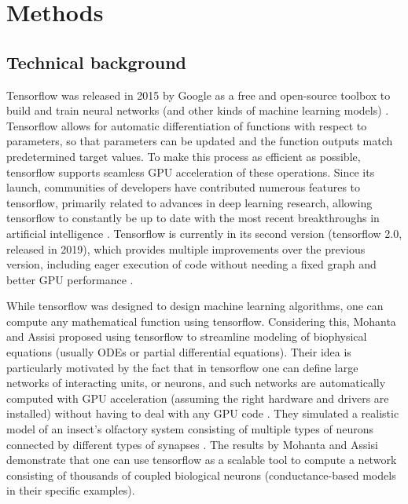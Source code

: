 \documentclass{report}
\begin{document}
\section{Methods}

\subsection{Technical background}

Tensorflow was released in 2015 by Google as a free and open-source toolbox to build and train neural networks (and other kinds of machine learning models) \cite{abadi2016tensorflow}. Tensorflow allows for automatic differentiation of functions with respect to parameters, so that parameters can be updated and the function outputs match predetermined target values. To make this process as efficient as possible, tensorflow supports seamless GPU acceleration of these operations. Since its launch, communities of developers have contributed numerous features to tensorflow, primarily related to advances in deep learning research, allowing tensorflow to constantly be up to date with the most recent breakthroughs in artificial intelligence \cite{abadi2016tensorflow}. Tensorflow is currently in its second version (tensorflow 2.0, released in 2019), which provides multiple improvements over the previous version, including eager execution of code without needing a fixed graph and better GPU performance \cite{campesato2019tensorflow}.

While tensorflow was designed to design machine learning algorithms, one can compute any mathematical function using tensorflow. Considering this, Mohanta and Assisi \cite{mohanta2019parallel} proposed using tensorflow to streamline modeling of biophysical equations (usually ODEs or partial differential equations). Their idea is particularly motivated by the fact that in tensorflow one can define large networks of interacting units, or neurons, and such networks are automatically computed with GPU acceleration (assuming the right hardware and drivers are installed) without having to deal with any GPU code \cite{mohanta2019parallel}. They simulated a realistic model of an insect’s olfactory system consisting of multiple types of neurons connected by different types of synapses \cite{mohanta2019parallel}. The results by Mohanta and Assisi \cite{mohanta2019parallel} demonstrate that one can use tensorflow as a scalable tool to compute a network consisting of thousands of coupled biological neurons (conductance-based models in their specific examples).
\end{document}
